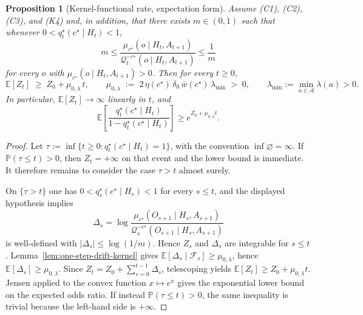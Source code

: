 \documentclass[11pt]{article}
\newtheorem{proposition}[theorem]{Proposition}
\theoremstyle{definition}
\theoremstyle{remark}
\newcommand{\Acal}{\mathcal{A}}
\newcommand{\Qcal}{\mathcal{Q}}
\newcommand{\E}{\mathbb{E}}
\newcommand{\Prob}{\mathbb{P}}
\begin{document}
\begin{proposition}[Kernel-functional rate, expectation form]
\label{prop:kernel-exp-rate}
Assume \textup{(C1)}, \textup{(C2)}, \textup{(C3)}, and \textup{(K4)} and, in addition, that there exists $m\in(0,1)$ such that whenever $0<q_t^\star(c^\star\mid H_t)<1$,
\[
m\le
\frac{\mu_{c^\star}(o\mid H_t,A_{t+1})}{\Qcal_t^{-c^\star}(o\mid H_t,A_{t+1})}
\le \frac{1}{m}
\]
for every $o$ with $\mu_{c^\star}(o\mid H_t,A_{t+1})>0$. Then for every $t\ge 0$,
\[
\E[Z_t]\;\ge\;Z_0+\mu_{0,\lambda}\,t,
\qquad
\mu_{0,\lambda}\;:=\;2\,\eta(c^\star)\,\delta_0\,\bar w(c^\star)\,\lambda_{\min}\;>\;0,
\qquad
\lambda_{\min}:=\min_{a\in\Acal}\lambda(a)>0.
\]
In particular, $\E[Z_t]\to\infty$ linearly in $t$, and
\[
\E\!\left[\frac{q_t^\star(c^\star\mid H_t)}{1-q_t^\star(c^\star\mid H_t)}\right]\ge e^{Z_0+\mu_{0,\lambda} t}.
\]
\end{proposition}

\begin{proof}
Let $\tau:=\inf\{t\ge 0:q_t^\star(c^\star\mid H_t)=1\}$, with the convention $\inf\varnothing=\infty$. If $\Prob(\tau\le t)>0$, then $Z_t=+\infty$ on that event and the lower bound is immediate. It therefore remains to consider the case $\tau>t$ almost surely.

On $\{\tau>t\}$ one has $0<q_s^\star(c^\star\mid H_s)<1$ for every $s\le t$, and the displayed hypothesis implies
\[
\Delta_s=\log\frac{\mu_{c^\star}(O_{s+1}\mid H_s,A_{s+1})}{\Qcal_s^{-c^\star}(O_{s+1}\mid H_s,A_{s+1})}
\]
is well-defined with $|\Delta_s|\le \log(1/m)$. Hence $Z_s$ and $\Delta_s$ are integrable for $s\le t$. Lemma~\ref{lem:one-step-drift-kernel} gives $\E[\Delta_s\mid\mathcal F_s]\ge\mu_{0,\lambda}$, hence $\E[\Delta_s]\ge\mu_{0,\lambda}$. Since $Z_t=Z_0+\sum_{s=0}^{t-1}\Delta_s$, telescoping yields $\E[Z_t]\ge Z_0+\mu_{0,\lambda}t$. Jensen applied to the convex function $x\mapsto e^x$ gives the exponential lower bound on the expected odds ratio. If instead $\Prob(\tau\le t)>0$, the same inequality is trivial because the left-hand side is $+\infty$.
\end{proof}
\end{document}
